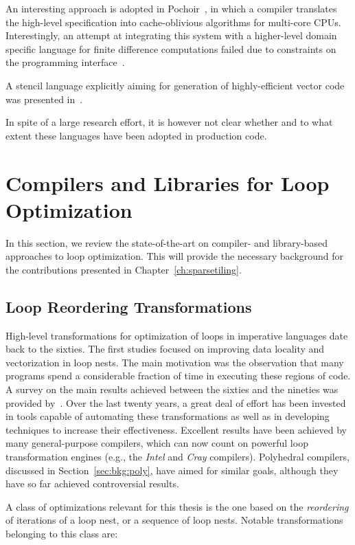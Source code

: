 An interesting approach is adopted in Pochoir~\citep{pochoir}, in which a compiler translates the high-level specification into cache-oblivious algorithms for multi-core CPUs. Interestingly, an attempt at integrating this system with a higher-level domain specific language for finite difference computations failed due to constraints on the programming interface~\citep{tj-thesis}. 

A stencil language explicitly aiming for generation of highly-efficient vector code was presented in~\cite{stencil-compiler}.

In spite of a large research effort, it is however not clear whether and to what extent these languages have been adopted in production code. 


\section{Compilers and Libraries for Loop Optimization}
\label{sec:bkg:codeopt}
In this section, we review the state-of-the-art on compiler- and library-based approaches to loop optimization. This will provide the necessary background for the contributions presented in Chapter~\ref{ch:sparsetiling}.

\subsection{Loop Reordering Transformations}
\label{sec:bkg:loop-transf}
High-level transformations for optimization of loops in imperative languages date back to the sixties. The first studies focused on improving data locality and vectorization in loop nests. The main motivation was the observation that many programs spend a considerable fraction of time in executing these regions of code. A survey on the main results achieved between the sixties and the nineties was provided by~\cite{bacon-comp-transf}. Over the last twenty years, a great deal of effort has been invested in tools capable of automating these transformations as well as in developing techniques to increase their effectiveness. Excellent results have been achieved by many general-purpose compilers, which can now count on powerful loop transformation engines (e.g., the {\em Intel} and {\em Cray} compilers). Polyhedral compilers, discussed in Section~\ref{sec:bkg:poly}, have aimed for similar goals, although they have so far achieved controversial results.

A class of optimizations relevant for this thesis is the one based on the {\em reordering} of iterations of a loop nest, or a sequence of loop nests. Notable transformations belonging to this class are:

